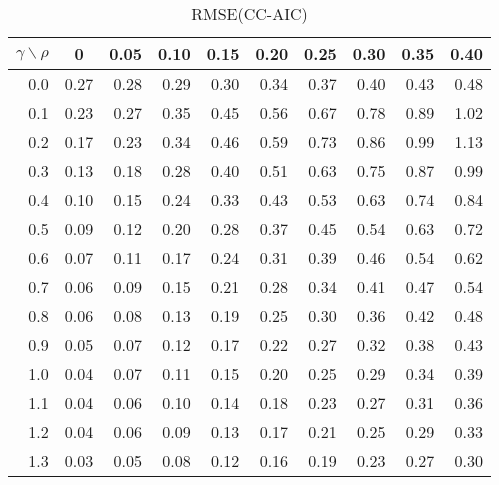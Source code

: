 \documentclass[12pt]{article}
\begin{document}
%
\begin{table}[!tbp]
\caption{RMSE(CC-AIC)}
 \begin{center}
 \begin{tabular}{r|rrrrrrrrr}\hline\hline
\multicolumn{1}{c|}{$\gamma\backslash\rho$}&\multicolumn{1}{c}{0}&\multicolumn{1}{c}{0.05}&\multicolumn{1}{c}{0.10}&\multicolumn{1}{c}{0.15}&\multicolumn{1}{c}{0.20}&\multicolumn{1}{c}{0.25}&\multicolumn{1}{c}{0.30}&\multicolumn{1}{c}{0.35}&\multicolumn{1}{c}{0.40}\tabularnewline
\hline
0.0&0.27&0.28&0.29&0.30&0.34&0.37&0.40&0.43&0.48\tabularnewline
0.1&0.23&0.27&0.35&0.45&0.56&0.67&0.78&0.89&1.02\tabularnewline
0.2&0.17&0.23&0.34&0.46&0.59&0.73&0.86&0.99&1.13\tabularnewline
0.3&0.13&0.18&0.28&0.40&0.51&0.63&0.75&0.87&0.99\tabularnewline
0.4&0.10&0.15&0.24&0.33&0.43&0.53&0.63&0.74&0.84\tabularnewline
0.5&0.09&0.12&0.20&0.28&0.37&0.45&0.54&0.63&0.72\tabularnewline
0.6&0.07&0.11&0.17&0.24&0.31&0.39&0.46&0.54&0.62\tabularnewline
0.7&0.06&0.09&0.15&0.21&0.28&0.34&0.41&0.47&0.54\tabularnewline
0.8&0.06&0.08&0.13&0.19&0.25&0.30&0.36&0.42&0.48\tabularnewline
0.9&0.05&0.07&0.12&0.17&0.22&0.27&0.32&0.38&0.43\tabularnewline
1.0&0.04&0.07&0.11&0.15&0.20&0.25&0.29&0.34&0.39\tabularnewline
1.1&0.04&0.06&0.10&0.14&0.18&0.23&0.27&0.31&0.36\tabularnewline
1.2&0.04&0.06&0.09&0.13&0.17&0.21&0.25&0.29&0.33\tabularnewline
1.3&0.03&0.05&0.08&0.12&0.16&0.19&0.23&0.27&0.30\tabularnewline
\hline
\end{tabular}

\end{center}

\end{table}
\end{document}
